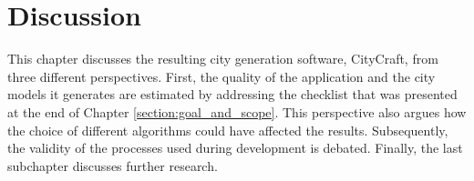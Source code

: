 \chapter{Discussion}

This chapter discusses the resulting city generation software, CityCraft, from three different perspectives.
First, the quality of the application and the city models it generates are estimated by addressing the checklist that was presented at the end of Chapter \ref{section:goal_and_scope}.
This perspective also argues how the choice of different algorithms could have affected the results.
Subsequently, the validity of the processes used during development is debated.
Finally, the last subchapter discusses further research.



